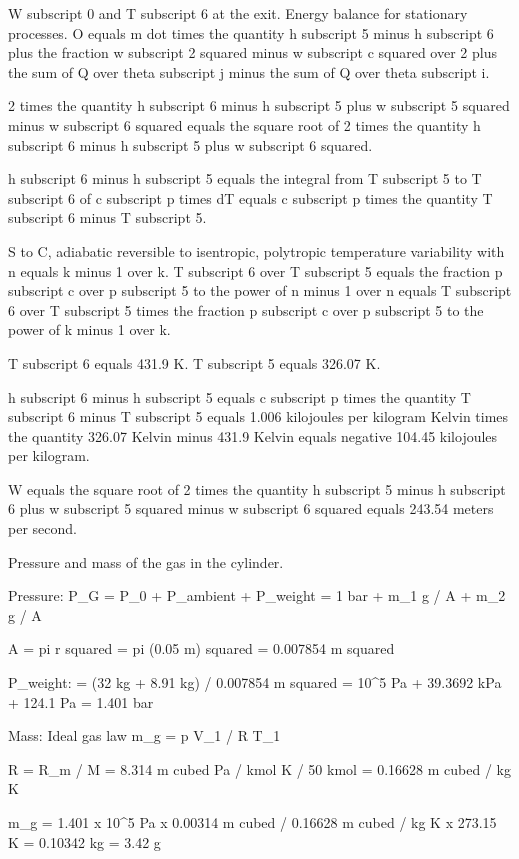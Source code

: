 W subscript 0 and T subscript 6 at the exit.
Energy balance for stationary processes.
O equals m dot times the quantity h subscript 5 minus h subscript 6 plus the fraction w subscript 2 squared minus w subscript c squared over 2 plus the sum of Q over theta subscript j minus the sum of Q over theta subscript i.

2 times the quantity h subscript 6 minus h subscript 5 plus w subscript 5 squared minus w subscript 6 squared equals the square root of 2 times the quantity h subscript 6 minus h subscript 5 plus w subscript 6 squared.

h subscript 6 minus h subscript 5 equals the integral from T subscript 5 to T subscript 6 of c subscript p times dT equals c subscript p times the quantity T subscript 6 minus T subscript 5.

S to C, adiabatic reversible to isentropic, polytropic temperature variability with n equals k minus 1 over k.
T subscript 6 over T subscript 5 equals the fraction p subscript c over p subscript 5 to the power of n minus 1 over n equals T subscript 6 over T subscript 5 times the fraction p subscript c over p subscript 5 to the power of k minus 1 over k.

T subscript 6 equals 431.9 K.
T subscript 5 equals 326.07 K.

h subscript 6 minus h subscript 5 equals c subscript p times the quantity T subscript 6 minus T subscript 5 equals 1.006 kilojoules per kilogram Kelvin times the quantity 326.07 Kelvin minus 431.9 Kelvin equals negative 104.45 kilojoules per kilogram.

W equals the square root of 2 times the quantity h subscript 5 minus h subscript 6 plus w subscript 5 squared minus w subscript 6 squared equals 243.54 meters per second.

Pressure and mass of the gas in the cylinder.

Pressure:
P_G = P_0 + P_ambient + P_weight
= 1 bar + m_1 g / A + m_2 g / A

A = pi r squared
= pi (0.05 m) squared
= 0.007854 m squared

P_weight:
= (32 kg + 8.91 kg) / 0.007854 m squared
= 10^5 Pa + 39.3692 kPa + 124.1 Pa
= 1.401 bar

Mass:
Ideal gas law
m_g = p V_1 / R T_1

R = R_m / M
= 8.314 m cubed Pa / kmol K / 50 kmol
= 0.16628 m cubed / kg K

m_g = 1.401 x 10^5 Pa x 0.00314 m cubed / 0.16628 m cubed / kg K x 273.15 K
= 0.10342 kg
= 3.42 g